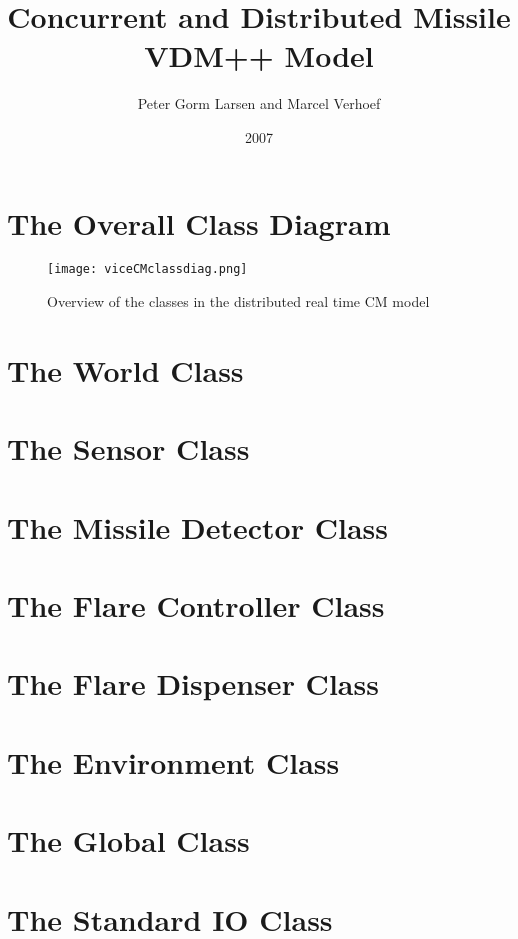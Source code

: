 \documentclass[\pformat,12pt]{article}
\title{Concurrent and Distributed Missile VDM++ Model}
\author{Peter Gorm Larsen and Marcel Verhoef}
\date{2007}
\begin{document}
\maketitle

\section{The Overall Class Diagram}

\begin{figure}[h]
\begin{center}
\texttt{[image: viceCMclassdiag.png]}
\end{center}
\caption{Overview of the classes in the distributed real time CM model}\label{fig:inputoutput}
\end{figure}
\newpage

\section{The World Class}



\section{The Sensor Class}



\section{The Missile Detector Class}



\section{The Flare Controller Class}



\section{The Flare Dispenser Class}



\section{The Environment Class}



\section{The Global Class}



\section{The Standard IO Class}



\printindex
{}
\end{document}
